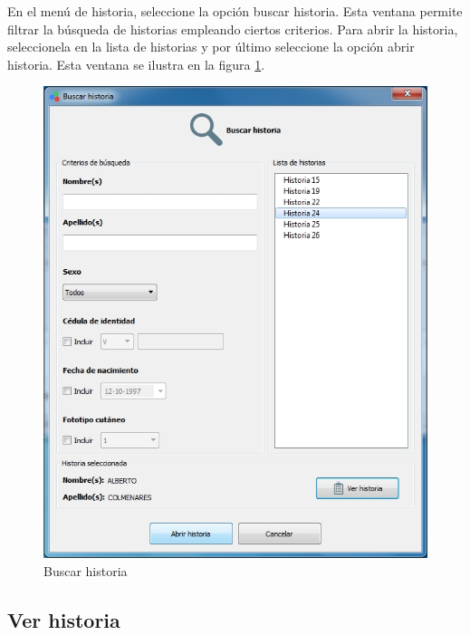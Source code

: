	En el men\'{u} de historia, seleccione la opci\'{o}n buscar historia. Esta ventana permite filtrar la b\'{u}squeda de historias empleando ciertos criterios. Para abrir la historia, seleccionela en la lista de historias y por \'{u}ltimo seleccione la opci\'{o}n abrir historia. Esta ventana se ilustra en la figura \ref{fig:buscar-historia}.
\vfill
\begin{figure}[H]
  \centering
  \includegraphics[width=.9\linewidth]{./img/buscar-historia.jpg}
\caption[]{Buscar historia\label{fig:buscar-historia}}
\end{figure}
\vfill
	\subsection*{Ver historia}
	
